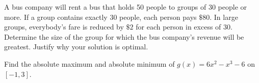 \documentclass[addpoints,12pt]{exam}
\begin{document}
\begin{questions}
\question[12] A bus company will rent a bus that holds 50 people to groups of 30 people or
more. If a group contains exactly 30 people, each person pays $\$80$. In large groups,
everybody's fare is reduced by $\$2$ for each person in excess of 30. Determine the size of the
group for which the bus company's revenue will be greatest. Justify why your solution is optimal.




\newpage

\question[10] Find the absolute maximum and absolute minimum of $g(x)=6x^2-x^3-6$ on
$[-1,3]$.


\vfill




\newpage

\question





\newpage

\end{questions}
\end{document}
